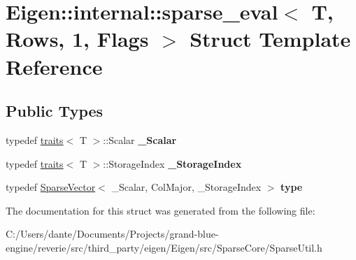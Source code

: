 \hypertarget{struct_eigen_1_1internal_1_1sparse__eval_3_01_t_00_01_rows_00_011_00_01_flags_01_4}{}\section{Eigen\+::internal\+::sparse\+\_\+eval$<$ T, Rows, 1, Flags $>$ Struct Template Reference}
\label{struct_eigen_1_1internal_1_1sparse__eval_3_01_t_00_01_rows_00_011_00_01_flags_01_4}
\subsection*{Public Types}
\begin{DoxyCompactItemize}
\item 
\mbox{\label{struct_eigen_1_1internal_1_1sparse__eval_3_01_t_00_01_rows_00_011_00_01_flags_01_4_a11eeffca8d2bdfb732081294d1d1332e}} 
typedef \mbox{\hyperlink{struct_eigen_1_1internal_1_1traits}{traits}}$<$ T $>$\+::Scalar {\bfseries \+\_\+\+Scalar}
\item 
\mbox{\label{struct_eigen_1_1internal_1_1sparse__eval_3_01_t_00_01_rows_00_011_00_01_flags_01_4_af5cedca3e3a701912033b4595e6cb12d}} 
typedef \mbox{\hyperlink{struct_eigen_1_1internal_1_1traits}{traits}}$<$ T $>$\+::Storage\+Index {\bfseries \+\_\+\+Storage\+Index}
\item 
\mbox{\label{struct_eigen_1_1internal_1_1sparse__eval_3_01_t_00_01_rows_00_011_00_01_flags_01_4_a36cdbf653debd1b9b67ea574bde18b93}} 
typedef \mbox{\hyperlink{class_eigen_1_1_sparse_vector}{Sparse\+Vector}}$<$ \+\_\+\+Scalar, Col\+Major, \+\_\+\+Storage\+Index $>$ {\bfseries type}
\end{DoxyCompactItemize}


The documentation for this struct was generated from the following file\+:\begin{DoxyCompactItemize}
\item 
C\+:/\+Users/dante/\+Documents/\+Projects/grand-\/blue-\/engine/reverie/src/third\+\_\+party/eigen/\+Eigen/src/\+Sparse\+Core/Sparse\+Util.\+h\end{DoxyCompactItemize}
